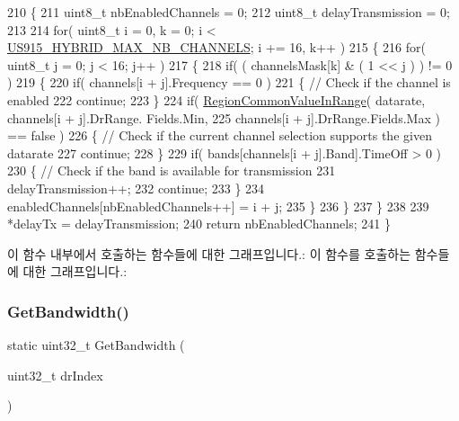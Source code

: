 \begin{DoxyCode}
210 \{
211     uint8\_t nbEnabledChannels = 0;
212     uint8\_t delayTransmission = 0;
213 
214     \textcolor{keywordflow}{for}( uint8\_t i = 0, k = 0; i < \mbox{\hyperlink{group___r_e_g_i_o_n_u_s915_h_y_b_ga977b73cbf7a5d15e2bf543fad5f35710}{US915\_HYBRID\_MAX\_NB\_CHANNELS}}; i += 16, k++ )
215     \{
216         \textcolor{keywordflow}{for}( uint8\_t j = 0; j < 16; j++ )
217         \{
218             \textcolor{keywordflow}{if}( ( channelsMask[k] & ( 1 << j ) ) != 0 )
219             \{
220                 \textcolor{keywordflow}{if}( channels[i + j].Frequency == 0 )
221                 \{ \textcolor{comment}{// Check if the channel is enabled}
222                     \textcolor{keywordflow}{continue};
223                 \}
224                 \textcolor{keywordflow}{if}( \mbox{\hyperlink{group___r_e_g_i_o_n_c_o_m_m_o_n_gafdd1c80d953e18d755a631b72a9c3bd3}{RegionCommonValueInRange}}( datarate, channels[i + j].DrRange.
      Fields.Min,
225                                               channels[i + j].DrRange.Fields.Max ) == \textcolor{keyword}{false} )
226                 \{ \textcolor{comment}{// Check if the current channel selection supports the given datarate}
227                     \textcolor{keywordflow}{continue};
228                 \}
229                 \textcolor{keywordflow}{if}( bands[channels[i + j].Band].TimeOff > 0 )
230                 \{ \textcolor{comment}{// Check if the band is available for transmission}
231                     delayTransmission++;
232                     \textcolor{keywordflow}{continue};
233                 \}
234                 enabledChannels[nbEnabledChannels++] = i + j;
235             \}
236         \}
237     \}
238 
239     *delayTx = delayTransmission;
240     \textcolor{keywordflow}{return} nbEnabledChannels;
241 \}
\end{DoxyCode}
이 함수 내부에서 호출하는 함수들에 대한 그래프입니다.\+:
이 함수를 호출하는 함수들에 대한 그래프입니다.\+:
\mbox{\label{_region_u_s915-_hybrid_8c_afbe81e6d36760141722791d216d4ac60}} 
\subsubsection{\texorpdfstring{Get\+Bandwidth()}{GetBandwidth()}}
{\footnotesize\ttfamily static uint32\+\_\+t Get\+Bandwidth (\begin{DoxyParamCaption}\item[{uint32\+\_\+t}]{dr\+Index }\end{DoxyParamCaption})\hspace{0.3cm}{\ttfamily [static]}}



